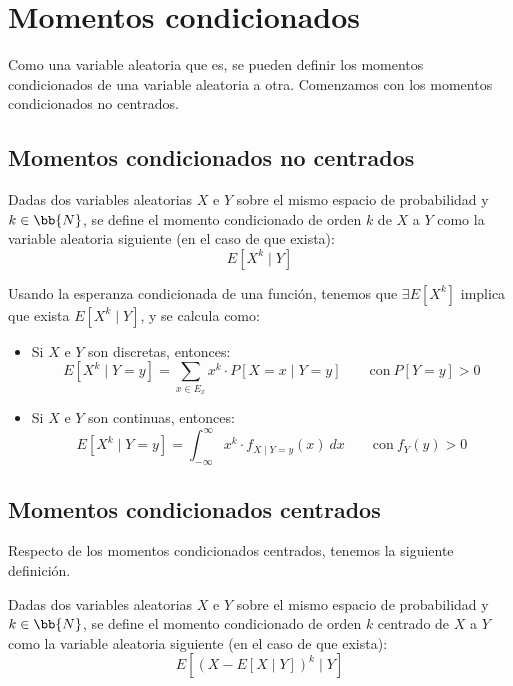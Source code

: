 \section{Momentos condicionados}

Como una variable aleatoria que es, se pueden definir los momentos condicionados de una variable aleatoria a otra.
Comenzamos con los momentos condicionados no centrados.
\subsection{Momentos condicionados no centrados}
\begin{definicion}
    Dadas dos variables aleatorias $X$ e $Y$ sobre el mismo espacio de probabilidad y $k\in \bb{N}$, se define el momento condicionado de orden $k$ de $X$ a $Y$ como la variable aleatoria siguiente (en el caso de que exista):
    \begin{equation*}
        E[X^k\mid Y]
    \end{equation*}
\end{definicion}

Usando la esperanza condicionada de una función, tenemos que $\exists E[X^k]$ implica que exista $E[X^k\mid Y]$, y se calcula como:
\begin{itemize}
    \item Si $X$ e $Y$ son discretas, entonces:
    \begin{equation*}
        E[X^k\mid Y = y] = \sum_{x\in E_x} x^k\cdot P[X = x\mid Y = y] \qquad \text{con}~P[Y=y]>0
    \end{equation*}

    \item Si $X$ e $Y$ son continuas, entonces:
    \begin{equation*}
        E[X^k\mid Y = y] = \int_{-\infty}^{\infty} x^k\cdot f_{X\mid Y=y}(x)~dx \qquad \text{con}~f_Y(y)>0
    \end{equation*}
\end{itemize}

\subsection{Momentos condicionados centrados}
Respecto de los momentos condicionados centrados, tenemos la siguiente definición.
\begin{definicion}
    Dadas dos variables aleatorias $X$ e $Y$ sobre el mismo espacio de probabilidad y $k\in \bb{N}$, se define el momento condicionado de orden $k$ centrado de $X$ a $Y$ como la variable aleatoria siguiente (en el caso de que exista):
    \begin{equation*}
        E[(X-E[X\mid Y])^k\mid Y]
    \end{equation*}
\end{definicion}

